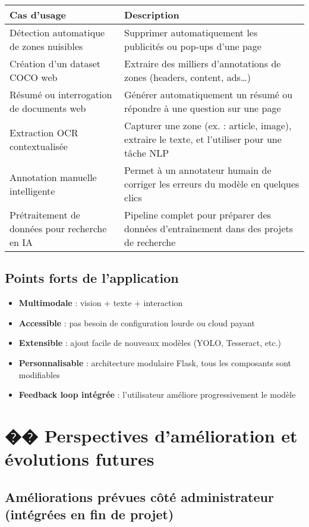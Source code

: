\documentclass[12pt,a4paper]{report}
\begin{document}
\begin{longtable}{|p{5cm}|p{9cm}|}
\hline
\textbf{Cas d'usage} & \textbf{Description} \\
\hline
Détection automatique de zones nuisibles & Supprimer automatiquement les publicités ou pop-ups d'une page \\
\hline
Création d'un dataset COCO web & Extraire des milliers d'annotations de zones (headers, content, ads…) \\
\hline
Résumé ou interrogation de documents web & Générer automatiquement un résumé ou répondre à une question sur une page \\
\hline
Extraction OCR contextualisée & Capturer une zone (ex. : article, image), extraire le texte, et l'utiliser pour une tâche NLP \\
\hline
Annotation manuelle intelligente & Permet à un annotateur humain de corriger les erreurs du modèle en quelques clics \\
\hline
Prétraitement de données pour recherche en IA & Pipeline complet pour préparer des données d'entraînement dans des projets de recherche \\
\hline
\end{longtable}

\section{Points forts de l'application}

\begin{itemize}
\item \textbf{Multimodale} : vision + texte + interaction
\item \textbf{Accessible} : pas besoin de configuration lourde ou cloud payant
\item \textbf{Extensible} : ajout facile de nouveaux modèles (YOLO, Tesseract, etc.)
\item \textbf{Personnalisable} : architecture modulaire Flask, tous les composants sont modifiables
\item \textbf{Feedback loop intégrée} : l'utilisateur améliore progressivement le modèle
\end{itemize}

\chapter{�� Perspectives d'amélioration et évolutions futures}

\section{Améliorations prévues côté administrateur (intégrées en fin de projet)}
\end{document}
